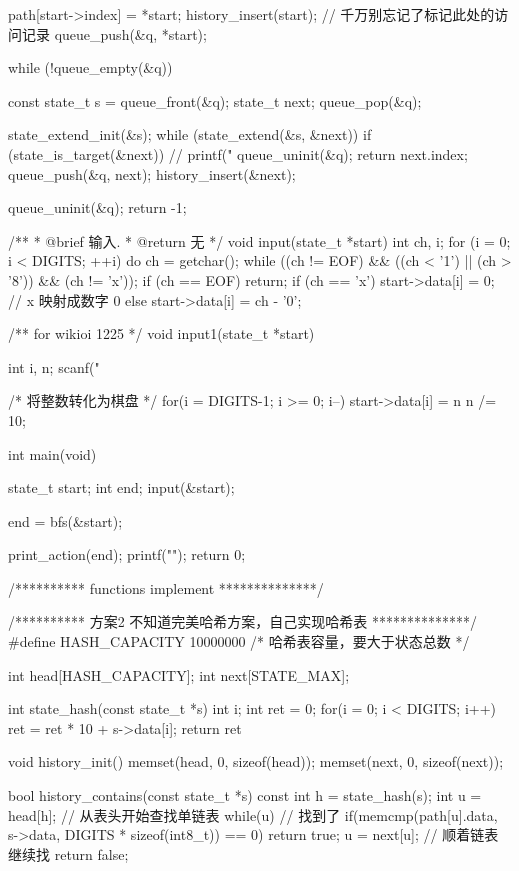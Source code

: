 \begin{Codex}[label=eight_digits_bfs2.c]
{    path[start->index] = *start;
    history_insert(start); // 千万别忘记了标记此处的访问记录
    queue_push(&q, *start);

    while (!queue_empty(&q)) {
        const state_t s = queue_front(&q);
        state_t next;
        queue_pop(&q);

        state_extend_init(&s);
        while (state_extend(&s, &next)) {
            if (state_is_target(&next)) {
                // printf("%
                queue_uninit(&q);
                return next.index;
            }
            queue_push(&q, next);
            history_insert(&next);
        }
    }
    queue_uninit(&q);
    return -1;
}

/**
 * @brief 输入.
 * @return 无
 */
void input(state_t *start) {
    int ch, i;
    for (i = 0; i < DIGITS; ++i) {
        do {
            ch = getchar();
        } while ((ch != EOF) && ((ch < '1') || (ch > '8')) && (ch != 'x'));
        if (ch == EOF) return;
        if (ch == 'x') start->data[i] = 0; // x 映射成数字 0
        else           start->data[i] = ch - '0';
    }
}

/** for wikioi 1225 */
void input1(state_t *start) {
    int i, n;
    scanf("%

    /* 将整数转化为棋盘 */
    for(i = DIGITS-1; i >= 0; i--) {
        start->data[i] = n %
        n /= 10;
    }
}

int main(void) {
    state_t start;
    int end;
    input(&start);

    end = bfs(&start);

    print_action(end);
    printf("\n");
    return 0;
}

/********** functions implement **************/

/********** 方案2 不知道完美哈希方案，自己实现哈希表 **************/
#define HASH_CAPACITY  10000000  /* 哈希表容量，要大于状态总数 */

int head[HASH_CAPACITY];
int next[STATE_MAX];

int state_hash(const state_t *s) {
    int i;
    int ret = 0;
    for(i = 0; i < DIGITS; i++) ret = ret * 10 + s->data[i];
    return ret %
}

void history_init() {
    memset(head, 0, sizeof(head));
    memset(next, 0, sizeof(next));
}

bool history_contains(const state_t *s) {
    const int h = state_hash(s);
    int u = head[h]; // 从表头开始查找单链表
    while(u) {
        // 找到了
        if(memcmp(path[u].data, s->data,
                DIGITS * sizeof(int8_t)) == 0) return true;
        u = next[u]; // 顺着链表继续找
    }
    return false;
}


\end{Codex}
